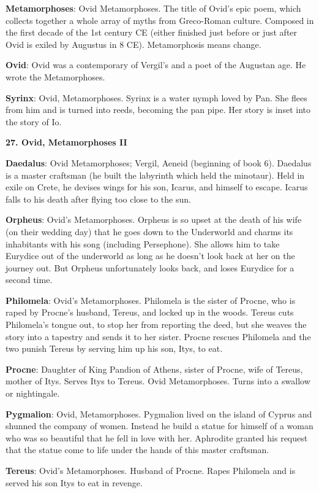 \documentclass{scrartcl}
\begin{document}
\begin{multicols*}{3}
{\bf Metamorphoses}: Ovid Metamorphoses. The title of Ovid's epic poem, which collects together a whole array of myths from Greco-Roman culture. Composed in the first decade of the 1st century CE (either finished just before or just after Ovid is exiled by Augustus in 8 CE). Metamorphosis means change.

{\bf Ovid}: Ovid was a contemporary of Vergil's and a poet of the Augustan age. He wrote the Metamorphoses.

{\bf Syrinx}: Ovid, Metamorphoses. Syrinx is a water nymph loved by Pan. She flees from him and is turned into reeds, becoming the pan pipe. Her story is inset into the story of Io.


{\bf 27. Ovid, Metamorphoses II}

{\bf Daedalus}: Ovid Metamorphoses; Vergil, Aeneid (beginning of book 6). Daedalus is a master craftsman (he built the labyrinth which held the minotaur). Held in exile on Crete, he devises wings for his son, Icarus, and himself to escape. Icarus falls to his death after flying too close to the sun.

{\bf Orpheus}: Ovid's Metamorphoses. Orpheus is so upset at the death of his wife (on their wedding day) that he goes down to the Underworld and charms its inhabitants with his song (including Persephone). She allows him to take Eurydice out of the underworld as long as he doesn't look back at her on the journey out. But Orpheus unfortunately looks back, and loses Eurydice for a second time. 

{\bf Philomela}: Ovid's Metamorphoses. Philomela is the sister of Procne, who is raped by Procne's husband, Tereus, and locked up in the woods. Tereus cuts Philomela's tongue out, to stop her from reporting the deed, but she weaves the story into a tapestry and sends it to her sister. Procne rescues Philomela and the two punish Tereus by serving him up his son, Itys, to eat.

{\bf Procne}: Daughter of King Pandion of Athens, sister of Procne, wife of Tereus, mother of Itys. Serves Itys to Tereus. Ovid Metamorphoses. Turns into a swallow or nightingale.

{\bf Pygmalion}: Ovid, Metamorphoses. Pygmalion lived on the island of Cyprus and shunned the company of women. Instead he build a statue for himself of a woman who was so beautiful that he fell in love with her. Aphrodite granted his request that the statue come to life under the hands of this master craftsman.

{\bf Tereus}: Ovid's Metamorphoses. Husband of Procne. Rapes Philomela and is served his son Itys to eat in revenge.



\end{multicols*}
\end{document}
